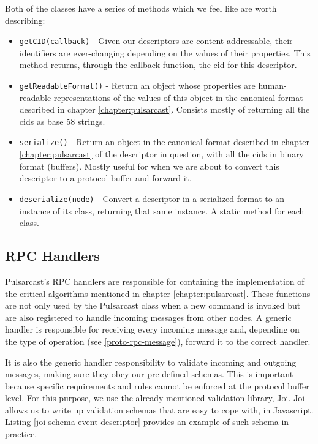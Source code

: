Both of the classes have a series of methods which we feel like are worth describing:

\begin{itemize}
  \item
    \verb|getCID(callback)| - Given our descriptors are content-addressable, their identifiers are ever-changing depending on the values of their properties. This method returns, through the callback function, the \acrshort{cid} for this descriptor.
  \item
    \verb|getReadableFormat()| - Return an object whose properties are human-readable representations of the values of this object in the canonical format described in chapter \ref{chapter:pulsarcast}. Consists mostly of returning all the \acrshort{cid}s as base 58 strings.
  \item
    \verb|serialize()| - Return an object in the canonical format described in chapter \ref{chapter:pulsarcast} of the descriptor in question, with all the \acrshort{cid}s in binary format (buffers). Mostly useful for when we are about to convert this descriptor to a protocol buffer and forward it.
  \item
    \verb|deserialize(node)| - Convert a descriptor in a serialized format to an instance of its class, returning that same instance. A static method for each class.
\end{itemize}


\subsection{RPC Handlers}\label{subsec:rpc-handlers}

Pulsarcast's RPC handlers are responsible for containing the implementation of
the critical algorithms mentioned in chapter \ref{chapter:pulsarcast}. These
functions are not only used by the Pulsarcast class when a new command is
invoked but are also registered to handle incoming messages from other nodes.
A generic handler is responsible for receiving every incoming message and,
depending on the type of operation (see \ref{proto-rpc-message}), forward it to
the correct handler.

It is also the generic handler responsibility to validate incoming and outgoing
messages, making sure they obey our pre-defined schemas. This is important
because specific requirements and rules cannot be enforced at the protocol
buffer level. For this purpose, we use the already mentioned validation
library, Joi. Joi allows us to write up validation schemas that are easy to
cope with, in Javascript. Listing \ref{joi-schema-event-descriptor} provides an
example of such schema in practice.

